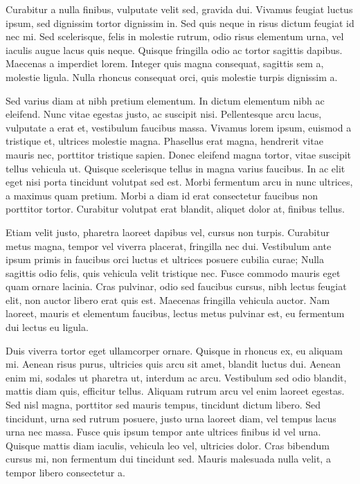 Curabitur a nulla finibus, vulputate velit sed, gravida dui. Vivamus feugiat luctus ipsum, sed dignissim tortor dignissim in. Sed quis neque in risus dictum feugiat id nec mi. Sed scelerisque, felis in molestie rutrum, odio risus elementum urna, vel iaculis augue lacus quis neque. Quisque fringilla odio ac tortor sagittis dapibus. Maecenas a imperdiet lorem. Integer quis magna consequat, sagittis sem a, molestie ligula. Nulla rhoncus consequat orci, quis molestie turpis dignissim a.

Sed varius diam at nibh pretium elementum. In dictum elementum nibh ac eleifend. Nunc vitae egestas justo, ac suscipit nisi. Pellentesque arcu lacus, vulputate a erat et, vestibulum faucibus massa. Vivamus lorem ipsum, euismod a tristique et, ultrices molestie magna. Phasellus erat magna, hendrerit vitae mauris nec, porttitor tristique sapien. Donec eleifend magna tortor, vitae suscipit tellus vehicula ut. Quisque scelerisque tellus in magna varius faucibus. In ac elit eget nisi porta tincidunt volutpat sed est. Morbi fermentum arcu in nunc ultrices, a maximus quam pretium. Morbi a diam id erat consectetur faucibus non porttitor tortor. Curabitur volutpat erat blandit, aliquet dolor at, finibus tellus.

Etiam velit justo, pharetra laoreet dapibus vel, cursus non turpis. Curabitur metus magna, tempor vel viverra placerat, fringilla nec dui. Vestibulum ante ipsum primis in faucibus orci luctus et ultrices posuere cubilia curae; Nulla sagittis odio felis, quis vehicula velit tristique nec. Fusce commodo mauris eget quam ornare lacinia. Cras pulvinar, odio sed faucibus cursus, nibh lectus feugiat elit, non auctor libero erat quis est. Maecenas fringilla vehicula auctor. Nam laoreet, mauris et elementum faucibus, lectus metus pulvinar est, eu fermentum dui lectus eu ligula.

Duis viverra tortor eget ullamcorper ornare. Quisque in rhoncus ex, eu aliquam mi. Aenean risus purus, ultricies quis arcu sit amet, blandit luctus dui. Aenean enim mi, sodales ut pharetra ut, interdum ac arcu. Vestibulum sed odio blandit, mattis diam quis, efficitur tellus. Aliquam rutrum arcu vel enim laoreet egestas. Sed nisl magna, porttitor sed mauris tempus, tincidunt dictum libero. Sed tincidunt, urna sed rutrum posuere, justo urna laoreet diam, vel tempus lacus urna nec massa. Fusce quis ipsum tempor ante ultrices finibus id vel urna. Quisque mattis diam iaculis, vehicula leo vel, ultricies dolor. Cras bibendum cursus mi, non fermentum dui tincidunt sed. Mauris malesuada nulla velit, a tempor libero consectetur a.

